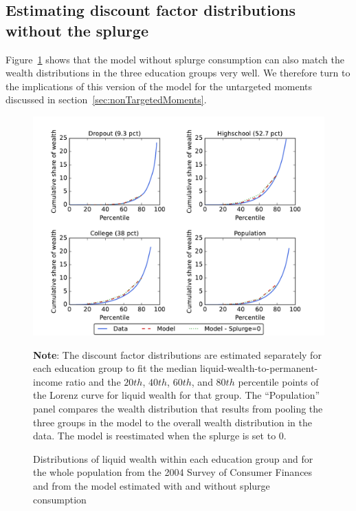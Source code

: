 \subsection{Estimating discount factor distributions without the splurge}

Figure~\ref{fig:LorenzPtsSplZero} shows that the model without splurge consumption can also match the wealth distributions in the three education groups very well.
We therefore turn to the implications of this version of the model for the untargeted moments discussed in section~\ref{sec:nonTargetedMoments}.


\begin{figure}[th]
	\begin{center}
		\includegraphics[width=.9\textwidth]{text/Chapter3/Figures/LorenzPoints_CRRA_2.0_R_1.01_wSplZero}
		\caption{Distributions of liquid wealth within each education group and for the whole population from the 2004 Survey of Consumer Finances and from the model estimated with and without splurge consumption}
		\label{fig:LorenzPtsSplZero}
		\parbox{16cm}{\small \vspace{.15cm} \textbf{Note}: The discount factor distributions are estimated separately for each education group to fit the median liquid-wealth-to-permanent-income ratio and the $20th$, $40th$, $60th$, and $80th$ percentile points of the Lorenz curve for liquid wealth for that group. The ``Population'' panel compares the wealth distribution that results from pooling the three groups in the model to the overall wealth distribution in the data. The model is reestimated when the splurge is set to $0$.}
		
	\end{center}
\end{figure}

